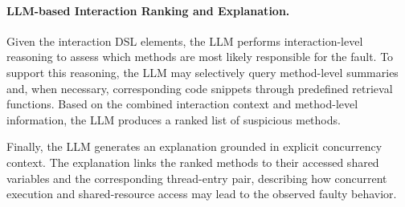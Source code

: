 \paragraph{LLM-based Interaction Ranking and Explanation.}
Given the interaction DSL elements, the LLM performs interaction-level reasoning to assess which methods are most likely responsible for the fault.
To support this reasoning, the LLM may selectively query method-level summaries and, when necessary, corresponding code snippets through predefined retrieval functions.
Based on the combined interaction context and method-level information, the LLM produces a ranked list of suspicious methods.

Finally, the LLM generates an explanation grounded in explicit concurrency context.
The explanation links the ranked methods to their accessed shared variables and the corresponding thread-entry pair, describing how concurrent execution and shared-resource access may lead to the observed faulty behavior.

